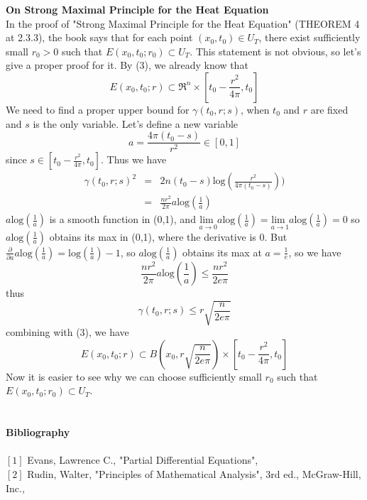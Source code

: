 \documentclass[a4paper,10pt]{article}
\begin{document}
\textbf{On Strong Maximal Principle for the Heat Equation} \\ 

In the proof of "Strong Maximal Principle for the Heat Equation" (THEOREM 4 at 2.3.3), the book says that for each point $(x_0,t_0)\in U_T$, there exist sufficiently small $r_0>0$ such that $E(x_0,t_0;r_0)\subset U_T$. This statement is not obvious, so let's give a proper proof for it. By (3), we already know that $$E(x_0,t_0;r)\subset\Re^n\times[t_0-\frac{r^2}{4\pi},t_0]$$ We need to find a proper upper bound for $\gamma(t_0,r;s)$, when $t_0$ and $r$ are fixed and $s$ is the only variable. Let's define a new variable $$a=\frac{4\pi (t_0-s)}{r^2}\in[0,1]$$ since $s\in[t_0-\frac{r^2}{4\pi},t_0]$. Thus we have \begin{eqnarray*}
\gamma(t_0,r;s)^2&=&2n(t_0-s)\text{log}(\frac{r^2}{4\pi(t_0-s)}))\\
&=&\frac{nr^2}{2\pi}a\text{log}(\frac{1}{a})
\end{eqnarray*}
$a\text{log}(\frac{1}{a})$ is a smooth function in (0,1), and $\underset{a\rightarrow 0}{\text{lim }}a\text{log}(\frac{1}{a})=\underset{a\rightarrow 1}{\text{lim }}a\text{log}(\frac{1}{a})=0$ so $a\text{log}(\frac{1}{a})$ obtains its max in (0,1), where the derivative is 0. But $\frac{\partial}{\partial a}a\text{log}(\frac{1}{a})=\text{log}(\frac{1}{a})-1$, so $a\text{log}(\frac{1}{a})$ obtains its max at $a=\frac{1}{e}$, so we have $$\frac{nr^2}{2\pi}a\text{log}(\frac{1}{a})\le\frac{nr^2}{2e\pi}$$ thus $$\gamma(t_0,r;s)\le r\sqrt{\frac{n}{2e\pi}}$$ combining with (3), we have $$E(x_0,t_0;r)\subset B(x_0,r\sqrt{\frac{n}{2e\pi}})\times[t_0-\frac{r^2}{4\pi},t_0]$$ Now it is easier to see why we can choose sufficiently small $r_0$ such that $E(x_0,t_0;r_0)\subset U_T$.\\ \\ \\	
	







\textbf{Bibliography}\\ \\
$[1]$ Evans, Lawrence C., "Partial Differential Equations",\\
$[2]$ Rudin, Walter, "Principles of Mathematical Analysis", 3rd ed., McGraw-Hill, Inc., 
\end{document}
